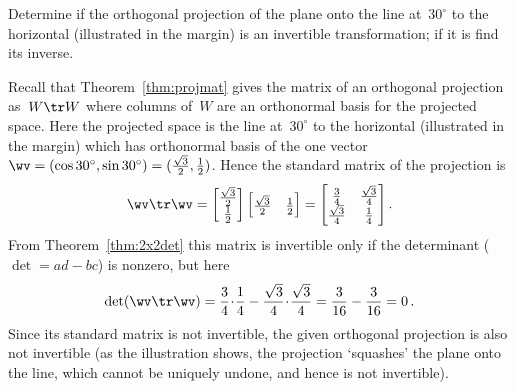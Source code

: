 \begin{example} \label{eg:}
Determine if the orthogonal projection of the plane onto the line at~\(30^\circ\) to the horizontal (illustrated in the margin) is an invertible transformation; if it is find its inverse.
%
\begin{solution} 
Recall that Theorem~\ref{thm:projmat} gives the matrix of an orthogonal projection as~\(W\tr W\) where columns of~\(W\) are an orthonormal basis for the projected space.
Here the projected space is the line at~\(30^\circ\) to the horizontal (illustrated in the margin) which has orthonormal basis of the one vector \(\wv=(\cos 30^\circ,\sin 30^\circ)=(\tfrac{\sqrt3}2,\tfrac12)\).
Hence the standard matrix of the projection is
\begin{equation*}
\wv\tr\wv=\begin{bmatrix} \tfrac{\sqrt3}2\\\tfrac12 \end{bmatrix}
\begin{bmatrix} \tfrac{\sqrt3}2&\tfrac12 \end{bmatrix}
=\begin{bmatrix} \tfrac34&\tfrac{\sqrt3}4\\
\tfrac{\sqrt3}4&\tfrac14 \end{bmatrix}.
\end{equation*}
From Theorem~\ref{thm:2x2det} this matrix is invertible only if the determinant (\(\det=ad-bc\)) is nonzero, but here
\begin{equation*}
\det(\wv\tr\wv)=\frac34\cdot\frac14-\frac{\sqrt3}4\cdot\frac{\sqrt3}4
=\frac3{16}-\frac3{16}=0\,.
\end{equation*}
Since its standard matrix is not invertible, the given orthogonal projection is also not invertible (as the illustration shows, the projection `squashes' the plane onto the line, which cannot be uniquely undone, and hence is not invertible).
\end{solution}
\end{example}







%



